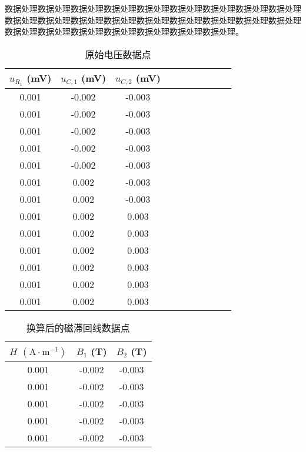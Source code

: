 \documentclass[UTF8]{article}
\theoremstyle{MyLineTheoremStyle} %
\theoremstyle{MyBlockTheoremStyle} %
\theoremstyle{MySubsubsectionStyle} %
\begin{document}
数据处理数据处理数据处理数据处理数据处理数据处理数据处理数据处理数据处理数据处理数据处理数据处理数据处理数据处理数据处理数据处理数据处理数据处理数据处理数据处理数据处理数据处理数据处理数据处理数据处理。

\begin{center}\noindent\begin{minipage}{0.35\columnwidth}
\begin{table}[H]\centering
        \caption{原始电压数据点}
        \label{1.1电压}
    \begin{tabular}{cccccccccc}\toprule
$u_{R_1}$ (mV) & $u_{C, 1}$ (mV) & $u_{C, 2}$ (mV)  \\
\midrule
0.001 &-0.002 &-0.003 \\
0.001 &-0.002 &-0.003 \\
0.001 &-0.002 &-0.003 \\
0.001 &-0.002 &-0.003 \\
0.001 &-0.002 &-0.003 \\
0.001 & 0.002 &-0.003 \\
0.001 & 0.002 &-0.003 \\
0.001 & 0.002 & 0.003 \\
0.001 & 0.002 & 0.003 \\
0.001 & 0.002 & 0.003 \\
0.001 & 0.002 & 0.003 \\
0.001 & 0.002 & 0.003 \\
0.001 & 0.002 & 0.003 \\
        \bottomrule
    \end{tabular}
\end{table}
\end{minipage}\begin{minipage}{0.35\columnwidth}
\begin{table}[H]\centering
    \caption{换算后的磁滞回线数据点}
    \label{1.1换算后}
    \begin{tabular}{ccc}\toprule
$H$ $\mathrm{(A\cdot m^{-1})}$ & $B_1$ (T) & $B_2$ (T)  \\
\midrule
0.001 &-0.002 &-0.003 \\
0.001 &-0.002 &-0.003 \\
0.001 &-0.002 &-0.003 \\
0.001 &-0.002 &-0.003 \\
0.001 &-0.002 &-0.003 \\

\end{tabular}
\end{table}
\end{minipage}
\end{center}
\end{document}
